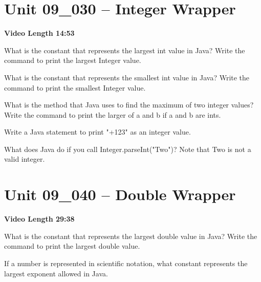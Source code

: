 \documentclass[letterpaper,12pt]{exam}
\newcommand{\unit}{Unit 09}
\begin{document}
\begin{questions}
\section*{\unit\_030 -- Integer Wrapper} 
\par{\selectfont\textbf{Video Length 14:53}}
\begin{samepage}
    \question What is the constant that represents the largest int value in Java?  Write the command to print the largest Integer value.
    \vspace{5mm}
\end{samepage}

\begin{samepage}
    \question What is the constant that represents the smallest int value in Java?  Write the command to print the smallest Integer value.
    \vspace{5mm}
\end{samepage}

\begin{samepage}
    \question What is the method that Java uses to find the maximum of two integer values?  Write the command to print the larger of a and b if a and b are ints.
    \vspace{5mm}
\end{samepage}

\begin{samepage}
    \question Write a Java statement to print "+123" as an integer value.
    \vspace{5mm}
\end{samepage}
\begin{samepage}
    \question What does Java do if you call Integer.parseInt("Two")?  Note that Two is not a valid integer. 
    \vspace{5mm}
\end{samepage}


\section*{\unit\_040 -- Double Wrapper } 
\par{\selectfont\textbf{Video Length 29:38}}
\begin{samepage}
    \question What is the constant that represents the largest double value in Java?  Write the command to print the largest double value.
    \vspace{5mm}
\end{samepage}

\begin{samepage}
    \question If a number is represented in scientific notation, what constant represents the largest exponent allowed in Java.
    \vspace{5mm}
\end{samepage}



\end{questions}
\end{document}
